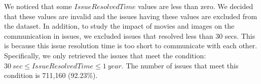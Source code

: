 We noticed that some $IssueResolvedTime$ values are less than zero. 
We decided that these values are invalid and the issues having 
these values are excluded from the dataset. 
In addition, to study the impact of movies and images on 
the communication in issues, 
we excluded issues that resolved less than 30 secs. 
This is because this issue resolution time is too short 
to communicate with each other. 
Specifically, we only retrieved the issues that meet 
the condition: $30\ sec \leq IssueResolvedTime \leq 1\ year$.
The number of issues that meet this condition is 711,160 (92.23\%).